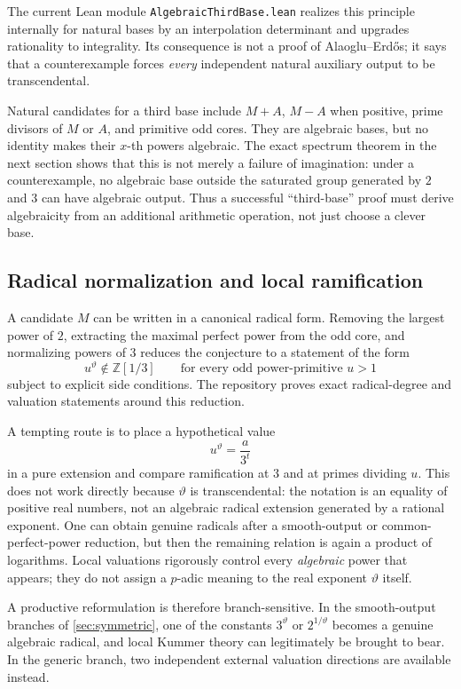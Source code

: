 \documentclass[11pt,oneside]{article}
\theoremstyle{definition}
\theoremstyle{remark}
\newcommand{\Z}{\mathbb Z}
\begin{document}
The current Lean module \texttt{AlgebraicThirdBase.lean} realizes this principle internally
for natural bases by an interpolation determinant and upgrades rationality to integrality.
Its consequence is not a proof of Alaoglu--Erd\H{o}s; it says that a counterexample forces
\emph{every} independent natural auxiliary output to be transcendental.

Natural candidates for a third base include $M+A$, $M-A$ when positive, prime divisors of
$M$ or $A$, and primitive odd cores.  They are algebraic bases, but no identity makes their
$x$-th powers algebraic.  The exact spectrum theorem in the next section shows that this is
not merely a failure of imagination: under a counterexample, no algebraic base outside the
saturated group generated by $2$ and $3$ can have algebraic output.  Thus a successful
``third-base'' proof must derive algebraicity from an additional arithmetic operation, not
just choose a clever base.

\subsection{Radical normalization and local ramification}

A candidate $M$ can be written in a canonical radical form.  Removing the largest power of
$2$, extracting the maximal perfect power from the odd core, and normalizing powers of $3$
reduces the conjecture to a statement of the form
\[
 u^{\vartheta}\notin\Z[1/3]
 \qquad\text{for every odd power-primitive }u>1
\]
subject to explicit side conditions.  The repository proves exact radical-degree and
valuation statements around this reduction.

A tempting route is to place a hypothetical value
\[
  u^{\vartheta}=\frac{a}{3^t}
\]
in a pure extension and compare ramification at $3$ and at primes dividing $u$.  This does
not work directly because $\vartheta$ is transcendental: the notation is an equality of
positive real numbers, not an algebraic radical extension generated by a rational exponent.
One can obtain genuine radicals after a smooth-output or common-perfect-power reduction, but
then the remaining relation is again a product of logarithms.  Local valuations rigorously
control every \emph{algebraic} power that appears; they do not assign a $p$-adic meaning to the
real exponent $\vartheta$ itself.

A productive reformulation is therefore branch-sensitive.  In the smooth-output branches
of \cref{sec:symmetric}, one of the constants $3^{\vartheta}$ or $2^{1/\vartheta}$ becomes a
genuine algebraic radical, and local Kummer theory can legitimately be brought to bear.  In
the generic branch, two independent external valuation directions are available instead.
\end{document}
